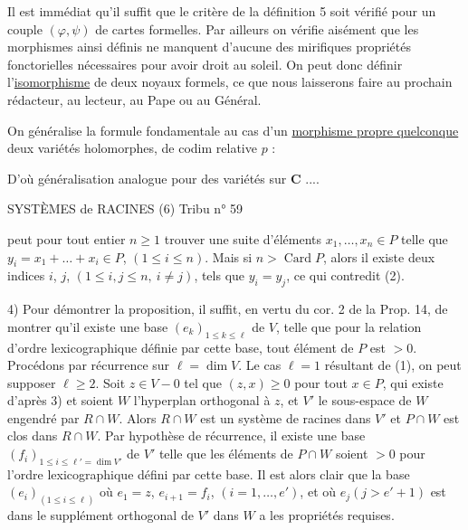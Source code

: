 Il est immédiat qu'il suffit que le critère de la définition 5 soit vérifié pour un couple $(\varphi,\psi)$ de cartes formelles. Par ailleurs on vérifie aisément que les morphismes ainsi définis ne manquent d'aucune des mirifiques propriétés fonctorielles nécessaires pour avoir droit au soleil. On peut donc définir l'\uline{isomorphisme} de deux noyaux formels, ce que nous laisserons faire au prochain rédacteur, au lecteur, au Pape ou au Général.


On généralise la formule fondamentale au cas d'un \uline{morphisme propre quelconque}
deux variétés  holomorphes,  de codim relative $p$ :

D'où généralisation analogue pour des variétés  sur $\mathbf C$ ....


SYSTÈMES de RACINES (6) \hfill Tribu n° 59

peut pour tout entier $n\geq1$ trouver une suite d'éléments $x_1,\ldots,x_n\in P$ telle que $y_i=x_1+\ldots+x_i\in P$, $(1\leq i\leq n)$. Mais si $n>\operatorname{Card}P$, alors il existe deux indices $i$, $j$, $(1\leq i,j\leq n,\ i\ne j)$, tels que $y_i=y_j$, ce qui contredit (2).

4) Pour démontrer la proposition, il suffit, en vertu du cor. 2 de la Prop. 14, de montrer qu'il existe une base $(e_k)_{1\leq k\leq\ell}$ de $V$, telle que pour la relation d'ordre lexicographique définie par cette base, tout élément de $P$ est $>0$. Procédons par récurrence sur $\ell=\dim V$. Le cas $\ell=1$ résultant de (1), on peut supposer $\ell\geq2$. Soit $z\in V-0$ tel que $(z,x)\geq0$ pour tout $x\in P$, qui existe d'après 3) et soient $W$ l'hyperplan orthogonal à $z$, et $V'$ le sous-espace de $W$ engendré par $R\cap W$. Alors $R\cap W$ est un système de racines dans $V'$ et $P\cap W$ est clos dans $R\cap W$. Par hypothèse de récurrence, il existe une base $(f_i)_{1\leq i\leq\ell'=\dim V'}$ de $V'$ telle que les éléments de $P\cap W$ soient $>0$ pour l'ordre lexicographique défini par cette base. Il est alors clair que la base $(e_i)_{(1\leq i\leq\ell)}$ où $e_1=z$, $e_{i+1}=f_i$, $(i=1,\ldots,e')$, et où $e_j(j>e'+1)$ est dans le supplément orthogonal de $V'$ dans $W$ a les propriétés requises.

